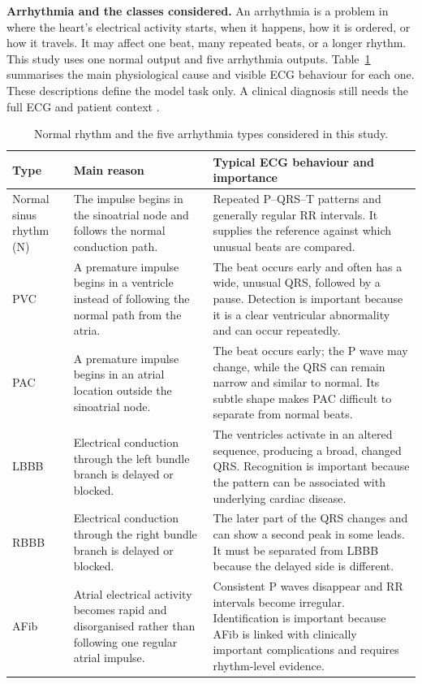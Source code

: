 \textbf{Arrhythmia and the classes considered.}
An arrhythmia is a problem in where the heart's electrical activity starts,
when it happens, how it is ordered, or how it travels. It may affect one beat,
many repeated beats, or a longer rhythm. This study uses one normal output and
five arrhythmia outputs. Table~\ref{tab:intro-arrhythmias} summarises the main
physiological cause and visible ECG behaviour for each one. These descriptions
define the model task only. A clinical diagnosis still needs the full ECG and
patient context \cite{moody2001impact,dechazal2004heartbeat}.

\begin{table}[H]
\centering
\small
\caption{Normal rhythm and the five arrhythmia types considered in this study.}
\label{tab:intro-arrhythmias}
\begin{tabular}{>{\raggedright\arraybackslash}p{2.2cm}>{\raggedright\arraybackslash}p{5.0cm}>{\raggedright\arraybackslash}p{5.4cm}}
\toprule
Type & Main reason & Typical ECG behaviour and importance\\
\midrule
Normal sinus rhythm (N) & The impulse begins in the sinoatrial node and follows
the normal conduction path. & Repeated P--QRS--T patterns and generally regular
RR intervals. It supplies the reference against which unusual beats are
compared.\\
PVC & A premature impulse begins in a ventricle instead of following the normal
path from the atria. & The beat occurs early and often has a wide, unusual QRS,
followed by a pause. Detection is important because it is a clear ventricular
abnormality and can occur repeatedly.\\
PAC & A premature impulse begins in an atrial location outside the sinoatrial
node. & The beat occurs early; the P wave may change, while the QRS can remain
narrow and similar to normal. Its subtle shape makes PAC difficult to separate
from normal beats.\\
LBBB & Electrical conduction through the left bundle branch is delayed or
blocked. & The ventricles activate in an altered sequence, producing a broad,
changed QRS. Recognition is important because the pattern can be associated
with underlying cardiac disease.\\
RBBB & Electrical conduction through the right bundle branch is delayed or
blocked. & The later part of the QRS changes and can show a second peak in some
leads. It must be separated from LBBB because the delayed side is different.\\
AFib & Atrial electrical activity becomes rapid and disorganised rather than
following one regular atrial impulse. & Consistent P waves disappear and RR
intervals become irregular. Identification is important because AFib is linked
with clinically important complications and requires rhythm-level evidence.\\
\bottomrule
\end{tabular}
\end{table}


